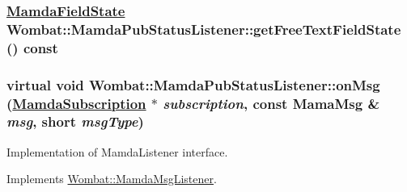 \hypertarget{classWombat_1_1MamdaPubStatusListener_2ae0c7afe5e413d50eb94497163d400f}{
\subsubsection[getFreeTextFieldState]{\setlength{\rightskip}{0pt plus 5cm}\hyperlink{namespaceWombat_93aac974f2ab713554fd12a1fa3b7d2a}{Mamda\-Field\-State} Wombat::Mamda\-Pub\-Status\-Listener::get\-Free\-Text\-Field\-State () const}}
\label{classWombat_1_1MamdaPubStatusListener_2ae0c7afe5e413d50eb94497163d400f}


\hypertarget{classWombat_1_1MamdaPubStatusListener_310318bfb5b54acdee23429c6db68dd2}{
\subsubsection[onMsg]{\setlength{\rightskip}{0pt plus 5cm}virtual void Wombat::Mamda\-Pub\-Status\-Listener::on\-Msg (\hyperlink{classWombat_1_1MamdaSubscription}{Mamda\-Subscription} $\ast$ {\em subscription}, const Mama\-Msg \& {\em msg}, short {\em msg\-Type})}}
\label{classWombat_1_1MamdaPubStatusListener_310318bfb5b54acdee23429c6db68dd2}


Implementation of Mamda\-Listener interface. 



Implements \hyperlink{classWombat_1_1MamdaMsgListener_c700829ebcce095b95b8b67b39a1c67d}{Wombat::Mamda\-Msg\-Listener}.